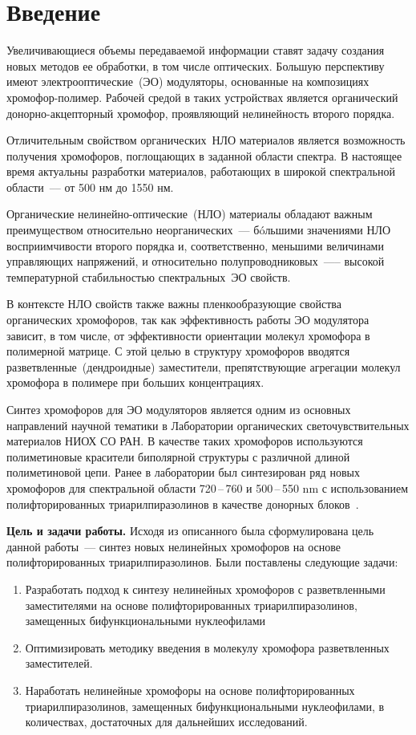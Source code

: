 \section{Введение}
Увеличивающиеся объемы передаваемой информации ставят задачу создания новых методов ее обработки, в том числе оптических. Большую перспективу имеют электрооптические~(ЭО) модуляторы, основанные на композициях хромофор-полимер. Рабочей средой в таких устройствах является органический донорно-акцепторный хромофор, проявляющий нелинейность второго порядка.

Отличительным свойством органических~НЛО материалов является возможность получения хромофоров, поглощающих в заданной области спектра. В настоящее время актуальны разработки материалов, работающих в широкой спектральной области~–-- от 500 нм до 1550 нм.

Органические нелинейно-оптические~(НЛО) материалы обладают важным преимуществом относительно неорганических~--- бóльшими значениями НЛО восприимчивости второго порядка и, соответственно, меньшими величинами управляющих напряжений, и относительно полупроводниковых~—-- высокой температурной стабильностью спектральных~ЭО свойств.

В контексте НЛО свойств также важны пленкообразующие свойства органических хромофоров, так как эффективность работы ЭО модулятора зависит, в том числе, от эффективности ориентации молекул хромофора в полимерной матрице. С этой целью в структуру хромофоров вводятся разветвленные~(дендроидные) заместители, препятствующие агрегации молекул хромофора в полимере при больших концентрациях.

Синтез хромофоров для ЭО модуляторов является одним из основных направлений научной тематики в Лаборатории органических светочувствительных материалов НИОХ СО РАН. В качестве таких хромофоров используются полиметиновые красители биполярной структуры с различной длиной полиметиновой цепи. Ранее в лаборатории был синтезирован ряд новых хромофоров для спектральной области 720\,--\,760 и 500\,--\,550 \si{\nano\metre} с использованием полифторированных триарилпиразолинов в качестве донорных блоков~\cite{2019, 2019b}.

\textbf{Цель и задачи работы.}
Исходя из описанного была сформулирована цель данной работы~--- синтез новых нелинейных хромофоров на основе полифторированных триарилпиразолинов.
Были поставлены следующие задачи:
\begin{enumerate}
    \item Разработать подход к синтезу нелинейных хромофоров с разветвленными заместителями на основе полифторированных триарилпиразолинов, замещенных бифункциональными нуклеофилами
    \item Оптимизировать методику введения в молекулу хромофора разветвленных заместителей.
    \item Наработать нелинейные хромофоры на основе полифторированных триарилпиразолинов, замещенных бифункциональными нуклеофилами, в количествах, достаточных для дальнейших исследований.
\end{enumerate}

